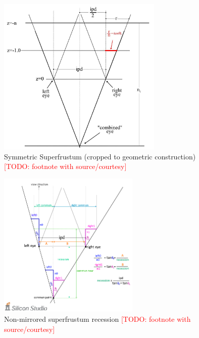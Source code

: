 \begin{figure}[htb]
  \centering
  \includegraphics[width=0.7\textwidth]{pictures/Everitt_Superfrustum_Crop}
  \caption{Symmetric Superfrustum (cropped to geometric construction)\cite{Everitt.2015} \textcolor{red}{[TODO: footnote with source/courtesy]}} \label{fig:Everitt_Superfrustum}
\end{figure}

\begin{figure}[htb]
  \centering
  \includegraphics[width=0.6\textwidth]{pictures/Oddou_Asymmetry}
  \caption{Non-mirrored superfrustum recession\cite{Oddou.23.05.2017} \textcolor{red}{[TODO: footnote with source/courtesy]}} \label{fig:Oddou_Asymmetry}
\end{figure}

